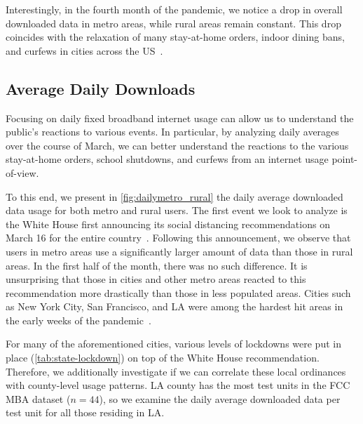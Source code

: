 Interestingly, in the fourth month of the pandemic, we notice a drop in overall downloaded data in metro areas, while rural areas remain constant. This drop coincides with the relaxation of many stay-at-home orders, indoor dining bans, and curfews in cities across the \gls{US}~\cite{money2020la,gov2020nyc}.


\subsection{Average Daily Downloads}
Focusing on daily fixed broadband internet usage can allow us to understand the public's reactions to various events. In particular, by analyzing daily averages over the course of March, we can better understand the reactions to the various stay-at-home orders, school shutdowns, and curfews from an internet usage point-of-view.

To this end, we present in \cref{fig:dailymetro_rural} the daily average downloaded data usage for both metro and rural users. The first event we look to analyze is the White House first announcing its social distancing recommendations on March 16 for the entire country~\cite{trump2020coronavirus}. Following this announcement, we observe that users in metro areas use a significantly larger amount of data than those in rural areas. In the first half of the month, there was no such difference. It is unsurprising that those in cities and other metro areas reacted to this recommendation more drastically than those in less populated areas. Cities such as New York City, San Francisco, and \gls{LA} were among the hardest hit areas in the early weeks of the pandemic~\cite{cdc2020tracker}.

For many of the aforementioned cities, various levels of lockdowns were put in place (\cref{tab:state-lockdown}) on top of the White House recommendation. Therefore, we additionally investigate if we can correlate these local ordinances with county-level usage patterns. \gls{LA} county has the most test units in the \gls{FCC} \gls{MBA} dataset ($n=44$), so we examine the daily average downloaded data per test unit for all those residing in \gls{LA}.

